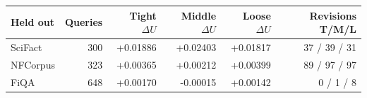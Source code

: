 \begin{tabular}{lrrrrr}
\toprule
Held out & Queries & Tight $\Delta U$ & Middle $\Delta U$ & Loose $\Delta U$ & Revisions T/M/L \\
\midrule
SciFact & 300 & +0.01886 & +0.02403 & +0.01817 & 37 / 39 / 31 \\
NFCorpus & 323 & +0.00365 & +0.00212 & +0.00399 & 89 / 97 / 97 \\
FiQA & 648 & +0.00170 & -0.00015 & +0.00142 & 0 / 1 / 8 \\
\bottomrule
\end{tabular}
